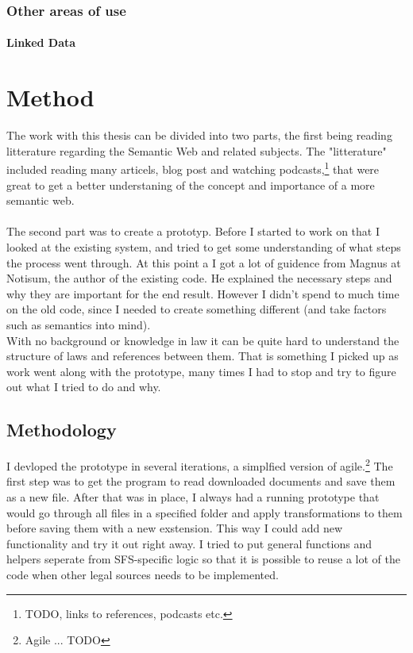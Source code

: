 \documentclass[a4paper,11pt]{kth-mag}
\begin{document}
\subsection{Other areas of use}
\subsubsection{Linked Data}
  
\chapter{Method}

The work with this thesis can be divided into two parts, the first being reading litterature regarding the Semantic Web and related subjects. The "litterature" included reading many articels, blog post and watching podcasts,\footnote{TODO, links to references, podcasts etc.} that were great to get a better understaning of the concept and importance of a more semantic web.\\\\  
The second part was to create a prototyp. Before I started to work on that I looked at the existing system, and tried to get some understanding of what steps the process went through. At this point a I got a lot of guidence from Magnus at Notisum, the author of the existing code. He explained the necessary steps and why they are important for the end result. However I didn't spend to much time on the old code, since I needed to create something different (and take factors such as semantics into mind).\\ With no background or knowledge in law it can be quite hard to understand the structure of laws and references between them. That is something I picked up as work went along with the prototype, many times I had to stop and try to figure out what I tried to do and why. 

\section{Methodology}
I devloped the prototype in several iterations, a simplfied version of agile.\footnote{Agile ... TODO} The first step was to get the program to read downloaded documents and save them as a new file. After that was in place, I always had a running prototype that would go through all files in a specified folder and apply transformations to them before saving them with a new exstension. This way I could add new functionality and try it out right away. I tried to put general functions and helpers seperate from SFS-specific logic so that it is possible to reuse a lot of the code when other legal sources needs to be implemented.     
\end{document}
